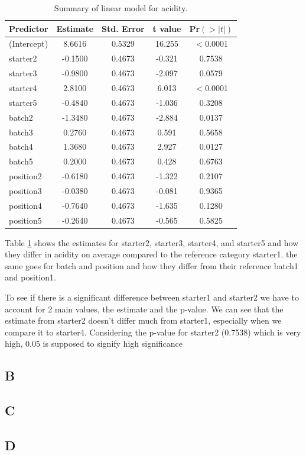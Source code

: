 \documentclass{article}
\begin{document}
\begin{table}[H]
\centering
\begin{tabular}{lcccc}
\hline
\textbf{Predictor} & \textbf{Estimate} & \textbf{Std. Error} & \textbf{t value} & \textbf{Pr$(>|t|)$} \\
\hline
(Intercept) & 8.6616 & 0.5329 & 16.255 & $<$0.0001\\
starter2    & -0.1500 & 0.4673 & -0.321 & 0.7538    \\
starter3    & -0.9800 & 0.4673 & -2.097 & 0.0579  \\
starter4    & 2.8100 & 0.4673 & 6.013  & $<$0.0001\\
starter5    & -0.4840 & 0.4673 & -1.036 & 0.3208    \\
batch2      & -1.3480 & 0.4673 & -2.884 & 0.0137  \\
batch3      & 0.2760 & 0.4673 & 0.591  & 0.5658    \\
batch4      & 1.3680 & 0.4673 & 2.927  & 0.0127  \\
batch5      & 0.2000 & 0.4673 & 0.428  & 0.6763    \\
position2   & -0.6180 & 0.4673 & -1.322 & 0.2107    \\
position3   & -0.0380 & 0.4673 & -0.081 & 0.9365    \\
position4   & -0.7640 & 0.4673 & -1.635 & 0.1280    \\
position5   & -0.2640 & 0.4673 & -0.565 & 0.5825    \\
\hline
\end{tabular}
\caption{Summary of linear model for acidity.}
\label{table:acidity}
\end{table}

Table \ref{table:acidity} shows the estimates for starter2, starter3, starter4, and starter5 and how they differ in acidity on average compared to the reference category starter1. the same goes for batch and position and how they differ from their reference batch1 and position1. 

To see if there is a significant difference between starter1 and starter2 we have to account for 2 main values, the estimate and the p-value. We can see that the estimate from starter2 doesn't differ much from starter1, especially when we compare it to starter4. Considering the p-value for starter2 (0.7538) which is very high, 0.05 is supposed to signify high significance



\subsection{B}



\subsection{C}

\subsection{D}




\end{document}
